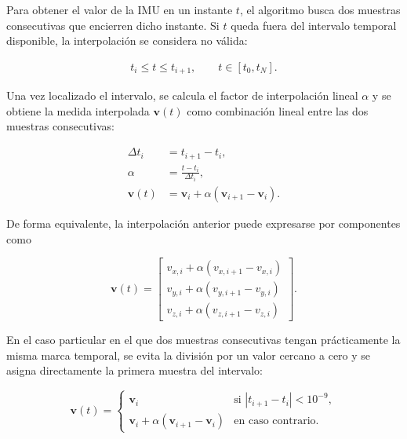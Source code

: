 Para obtener el valor de la IMU en un instante $t$, el algoritmo busca dos muestras consecutivas que encierren dicho 
instante. Si $t$ queda fuera del intervalo temporal disponible, la interpolación se considera no válida:

\begin{equation}
\begin{aligned}
    t_i \leq t \leq t_{i+1},
    \qquad
    t \in \left[t_0,t_N\right].
\end{aligned}
\end{equation}

Una vez localizado el intervalo, se calcula el factor de interpolación lineal $\alpha$ y se obtiene la medida interpolada 
$\mathbf{v}(t)$ como combinación lineal entre las dos muestras consecutivas:

\begin{equation}
\begin{aligned}
    \Delta t_i
    &=
    t_{i+1}-t_i,
    \\[1mm]
    \alpha
    &=
    \frac{t-t_i}{\Delta t_i},
    \\[1mm]
    \mathbf{v}(t)
    &=
    \mathbf{v}_i
    +
    \alpha
    \left(
        \mathbf{v}_{i+1}
        -
        \mathbf{v}_i
    \right).
\end{aligned}
\label{eq:interpolacion_imu}
\end{equation}

De forma equivalente, la interpolación anterior puede expresarse por componentes como

\begin{equation}
    \mathbf{v}(t)
    =
    \begin{bmatrix}
        v_{x,i} + \alpha \left(v_{x,i+1} - v_{x,i}\right) \\
        v_{y,i} + \alpha \left(v_{y,i+1} - v_{y,i}\right) \\
        v_{z,i} + \alpha \left(v_{z,i+1} - v_{z,i}\right)
    \end{bmatrix}.
\end{equation}

En el caso particular en el que dos muestras consecutivas tengan prácticamente la misma marca temporal, se evita la 
división por un valor cercano a cero y se asigna directamente la primera muestra del intervalo:

\begin{equation}
    \mathbf{v}(t)
    =
    \begin{cases}
        \mathbf{v}_i
        &
        \text{si }
        \left|t_{i+1}-t_i\right| < 10^{-9},
        \\[1mm]
        \mathbf{v}_i
        +
        \alpha
        \left(
            \mathbf{v}_{i+1}
            -
            \mathbf{v}_i
        \right)
        &
        \text{en caso contrario}.
    \end{cases}
\end{equation}

